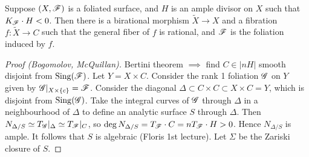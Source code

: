 \begin{theorem}[Miyaoka]
    Suppose $(X,\mathscr{F})$ is a foliated surface, and $H$ is an ample divisor on
    $X$ such that $K_{\mathscr{F}}\cdot H<0$. Then there is a birational morphism
    $\tilde X\to X$ and a fibration $f:\tilde X\to C$ such that the general
    fiber of $f$ is rational, and $\mathscr{F}$ is the foliation induced by $f$.
\end{theorem}

\begin{proof}[Proof (Bogomolov, McQuillan)]
    Bertini theorem $\implies$ find $C\in|nH|$ smooth disjoint from
    $\operatorname{Sing}(\mathscr{F})$. Let $Y=X\times C$. Consider the rank 1 foliation $\mathscr{G}$ on
    $Y$ given by $\mathscr{G}|_{X\times\{c\}}=\mathscr{F}$. Consider the diagonal
    $\Delta\subset C\times C\subset X\times C=Y$, which is disjoint from
    $\operatorname{Sing}(\mathscr{G})$. Take the integral curves of $\mathscr{G}$ through $\Delta$ in a
    neighbourhood of $\Delta$ to define an analytic surface $S$ through
    $\Delta$. Then $N_{\Delta/S}\simeq T_{\mathscr{G}}|_\Delta\simeq T_{\mathscr{F}}|_C$, so
    $\deg N_{\Delta/S}=T_{\mathscr{F}}\cdot C=nT_{\mathscr{F}}\cdot H>0$. Hence $N_{\Delta/S}$
    is ample. It follows that $S$ is algebraic (Floris 1st lecture). Let
    $\Sigma$ be the Zariski closure of $S$. %
\end{proof}
